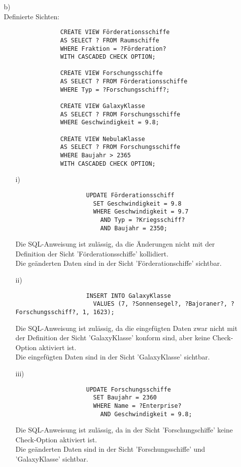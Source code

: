 \documentclass[a4paper,11pt,fleqn]{scrartcl}
\begin{document}
\begin{enumerate}
\begin{enumerate}
			\item[b)] \quad \\
			Definierte Sichten:
			\begin{verbatim}
				CREATE VIEW Förderationsschiffe
				AS SELECT ? FROM Raumschiffe
				WHERE Fraktion = ?Förderation?
				WITH CASCADED CHECK OPTION;

				CREATE VIEW Forschungsschiffe
				AS SELECT ? FROM Förderationsschiffe
				WHERE Typ = ?Forschungsschiff?;

				CREATE VIEW GalaxyKlasse
				AS SELECT ? FROM Forschungsschiffe
				WHERE Geschwindigkeit = 9.8;

				CREATE VIEW NebulaKlasse
				AS SELECT ? FROM Forschungsschiffe
				WHERE Baujahr > 2365
				WITH CASCADED CHECK OPTION;
			\end{verbatim}
			
			\newpage
			\begin{enumerate}
				\item[i)]
				\begin{verbatim}
					UPDATE Förderationsschiff
					  SET Geschwindigkeit = 9.8
					  WHERE Geschwindigkeit = 9.7
						AND Typ = ?Kriegsschiff?
						AND Baujahr = 2350;
				\end{verbatim}
				Die SQL-Anweisung ist zulässig, da die Änderungen nicht mit der Definition der Sicht 'Förderationsschiffe' kollidiert.\\
				Die geänderten Daten sind in der Sicht 'Förderationschiffe' sichtbar.

				\item[ii)]
				\begin{verbatim}
					INSERT INTO GalaxyKlasse
					  VALUES (7, ?Sonnensegel?, ?Bajoraner?, ?Forschungsschiff?, 1, 1623);
				\end{verbatim}
				Die SQL-Anweisung ist zulässig, da die eingefügten Daten zwar nicht mit der Definition der Sicht 'GalaxyKlasse' konform sind, aber keine Check-Option aktiviert ist.\\
				Die eingefügten Daten sind in der Sicht 'GalaxyKlasse' sichtbar.

				\item[iii)]
				\begin{verbatim}
					UPDATE Forschungsschiffe
					  SET Baujahr = 2360
					  WHERE Name = ?Enterprise?
						AND Geschwindigkeit = 9.8;
				\end{verbatim}
				Die SQL-Anweisung ist zulässig, da in der Sicht 'Forschungschiffe' keine Check-Option aktiviert ist.\\
				Die geänderten Daten sind in der Sicht 'Forschungsschiffe' und 'GalaxyKlasse' sichtbar.


\end{enumerate}
\end{enumerate}
\end{enumerate}
\end{document}

